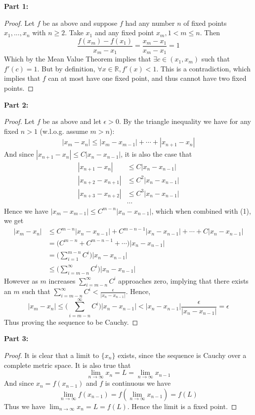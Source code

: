 \documentclass[12pt, letterpaper]{article}
\begin{document}
\textbf{Part 1:}
\begin{proof}
  Let $f$ be as above and suppose $f$ had any number $n$ of fixed points $x_1, ..., x_n$ with $n \geq 2$. Take $x_1$ and any fixed point $x_m, 1 < m \leq n$.
  Then
  $$ \frac{f(x_m) - f(x_1)}{x_m-x_1} = \frac{x_m - x_1}{x_m-x_1} = 1$$
  Which by the Mean Value Theorem implies that $\exists c \in (x_1, x_m)$ such that $f'(c) = 1$. But by definition, $\forall x \in \mathbb R, f'(x) < 1$.
  This is a contradiction, which implies that $f$ can at most have one fixed point, and thus cannot have two fixed points.
\end{proof}
\pagebreak
\textbf{Part 2:}
\begin{proof}
  Let $f$ be as above and let $\epsilon > 0$. By the triangle inequality we have for any fixed $n > 1$ (w.l.o.g. assume $m > n$):
  \begin{align}
  |x_m - x_n| \leq |x_m - x_{m-1}| + \cdots + |x_{n+1} - x_{n}|
  \end{align}
  And since $|x_{n+1} - x_n| \leq C|x_n - x_{n-1}|$, it is also the case that
  \begin{align*}
    |x_{n+1} - x_n| &\leq C|x_n - x_{n-1}|\\
    |x_{n+2} - x_{n+1}| &\leq C^2|x_n - x_{n-1}|\\
    |x_{n+3} - x_{n+2}| &\leq C^3|x_n - x_{n-1}|\\
    &\cdots
  \end{align*}
  Hence we have $|x_m - x_{m-1}| \leq C^{m-n}|x_n - x_{n-1}|$, which when combined with (1), we get
  \begin{align*}
    |x_m - x_n| &\leq C^{m-n}|x_n - x_{n-1}| + C^{m-n-1}|x_n - x_{n-1}| + \cdots + C|x_n - x_{n-1}|\\
    &= \big(C^{m-n} + C^{m-n-1} + \cdots \big)|x_n - x_{n-1}|\\
    &= \Bigg( \sum^{m-n}_{i=1} C^i \Bigg)|x_n - x_{n-1}|\\
    &\leq\Bigg( \sum^{\infty}_{i=m-n} C^i \Bigg)|x_n - x_{n-1}|
  \end{align*}
  However as $m$ increases $\sum^{\infty}_{i=m-n} C^i$ approaches zero, implying that there exists an $m$ such that $\sum^{\infty}_{i=m-n} C^i < \frac{\epsilon}{|x_n - x_{n-1}|}$.
  Hence,
  $$ |x_m - x_n| \leq \Bigg( \sum^{\infty}_{i=m-n} C^i\Bigg) |x_n - x_{n-1}| < |x_n - x_{n-1}|\frac{\epsilon}{|x_n - x_{n-1}|} = \epsilon $$
  Thus proving the sequence to be Cauchy.
\end{proof}
\textbf{Part 3:}
\begin{proof}
  It is clear that a limit to $\{x_n\}$ exists, since the sequence is Cauchy over a complete metric space. It is also true that
  $$ \lim_{n \to \infty} x_n = L = \lim_{n \to \infty} x_{n-1} $$
  And since $x_n = f(x_{n-1})$ and $f$ is continuous we have
  $$ \lim_{n \to \infty} f(x_{n-1}) = f(\lim_{n \to \infty} x_{n-1}) = f(L) $$
  Thus we have $\lim_{n \to \infty} x_{n} = L = f(L)$. Hence the limit is a fixed point.
\end{proof}
\end{document}
